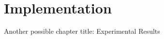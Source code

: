 %
%
%
\chapter{Implementation}\label{ch:implem}
Another possible chapter title: Experimental Results
